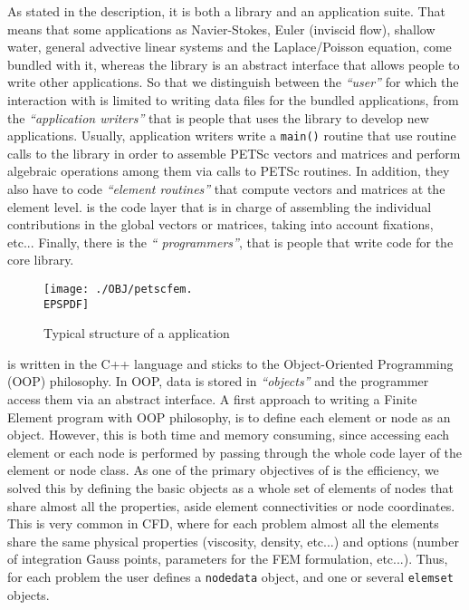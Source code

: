 

%
As stated in the \pfem{} description, it is both a library and an
application suite. That means that some applications as Navier-Stokes,
Euler (inviscid flow), shallow water, general advective linear systems
and the Laplace/Poisson equation, come bundled with it, whereas the
library is an abstract interface that allows people to write other
applications. So that we distinguish between the \emph{``user''} for
which the interaction with \pfem{} is limited to writing data files
for the bundled applications, from the \emph{``application writers''}
that is people that uses the library to develop new
applications. Usually, application writers write a \verb+main()+
routine that use routine calls to the \pfem{} library in order to
assemble PETSc vectors and matrices and perform algebraic operations
among them via calls to PETSc routines.  In addition, they also have
to code \emph{``element routines''} that compute vectors and matrices
at the element level. \pfem{} is the code layer that is in charge of
assembling the individual contributions in the global vectors or
matrices, taking into account fixations, etc...  Finally, there is the
\emph{``\pfem{} programmers''}, that is people that write code for the
core library.

\begin{figure*}[htb]
\centerline{\texttt{[image: ./OBJ/petscfem.\\EPSPDF]}}
\caption{Typical structure of a \pfem{} application}
\label{fg:petscfem}
\end{figure*}


\pfem{} is written in the C++ language and sticks to the
Object-Oriented Programming (OOP) philosophy. In OOP, data is stored
in \emph{``objects''} and the programmer access them via an abstract
interface. A first approach to writing a Finite Element program with
OOP philosophy, is to define each element or node as an
object. However, this is both time and memory consuming, since
accessing each element or each node is performed by passing through
the whole code layer of the element or node class. As one of the
primary objectives of \pfem{} is the efficiency, we solved this by
defining the basic objects as a whole set of elements of nodes that
share almost all the properties, aside element connectivities or node
coordinates. This is very common in CFD, where for each problem almost
all the elements share the same physical properties (viscosity,
density, etc...) and options (number of integration Gauss points,
parameters for the FEM formulation, etc...). Thus, for each problem
the user defines a \verb+nodedata+ object, and one or several
\verb+elemset+ objects. 

